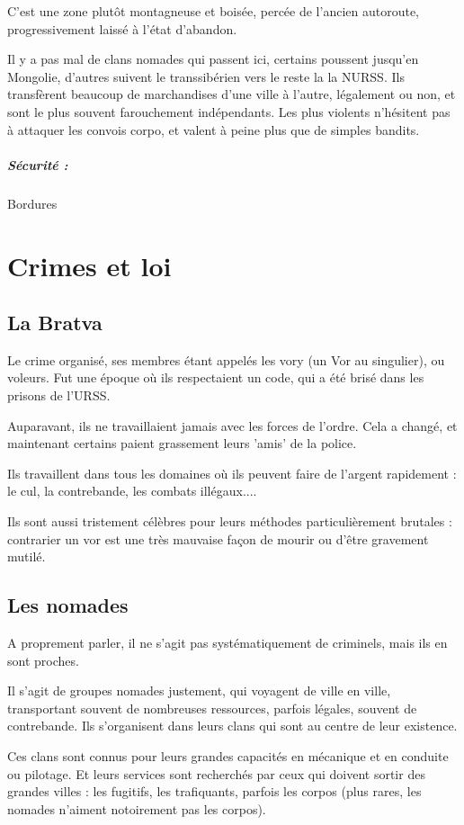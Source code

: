 \documentclass[10pt,a4paper]{book}
\begin{document}
C'est une zone plutôt montagneuse et boisée, percée de l'ancien autoroute, progressivement laissé à l'état d'abandon.

Il y a pas mal de clans nomades qui passent ici, certains poussent jusqu'en Mongolie, d'autres suivent le transsibérien vers le reste la la NURSS. Ils transfèrent beaucoup de marchandises d'une ville à l'autre, légalement ou non, et sont le plus souvent farouchement indépendants. Les plus violents n'hésitent pas à attaquer les convois corpo, et valent à peine plus que de simples bandits.
\paragraph{Sécurité :}Bordures
\chapter{Crimes et loi}
\section{La Bratva}
Le crime organisé, ses membres étant appelés les vory (un Vor au singulier), ou voleurs. Fut une époque où ils respectaient un code, qui a été brisé dans les prisons de l'URSS. 

Auparavant, ils ne travaillaient jamais avec les forces de l'ordre. Cela a changé, et maintenant certains paient grassement leurs 'amis' de la police.

Ils travaillent dans tous les domaines où ils peuvent faire de l'argent rapidement : le cul, la contrebande, les combats illégaux.... 

Ils sont aussi tristement célèbres pour leurs méthodes particulièrement brutales : contrarier un vor est une très mauvaise façon de mourir ou d'être gravement mutilé.
\section{Les nomades}
A proprement parler, il ne s'agit pas systématiquement de criminels, mais ils en sont proches.

Il s'agit de groupes nomades justement, qui voyagent de ville en ville, transportant souvent de nombreuses ressources, parfois légales, souvent de contrebande. Ils s'organisent dans leurs clans qui sont au centre de leur existence.

Ces clans sont connus pour leurs grandes capacités en mécanique et en conduite ou pilotage. Et leurs services sont recherchés par ceux qui doivent sortir des grandes villes : les fugitifs, les trafiquants, parfois les corpos (plus rares, les nomades n'aiment notoirement pas les corpos). 
\end{document}
